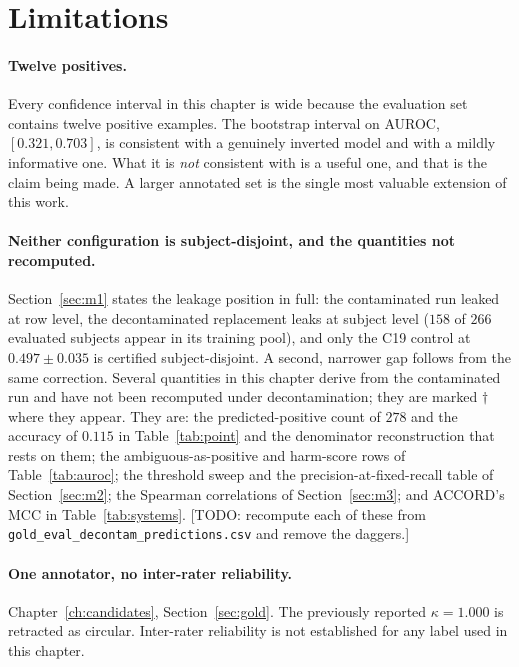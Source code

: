 \section{Limitations}
\label{sec:eval-limitations}

\paragraph{Twelve positives.} Every confidence interval in this chapter is wide
because the evaluation set contains twelve positive examples. The bootstrap
interval on AUROC, $[0.321, 0.703]$, is consistent with a genuinely inverted
model and with a mildly informative one. What it is \emph{not} consistent with
is a useful one, and that is the claim being made. A larger annotated set is the
single most valuable extension of this work.

\paragraph{Neither configuration is subject-disjoint, and the quantities not
recomputed.} Section~\ref{sec:m1} states the leakage position in full: the
contaminated run leaked at row level, the decontaminated replacement leaks at
subject level ($158$ of $266$ evaluated subjects appear in its training pool),
and only the C19 control at $0.497 \pm 0.035$ is certified subject-disjoint. A
second, narrower gap follows from the same correction. Several quantities in
this chapter derive from the contaminated run and have not been recomputed under
decontamination; they are marked $\dagger$ where they appear. They are: the
predicted-positive count of $278$ and the accuracy of $0.115$ in
Table~\ref{tab:point} and the denominator reconstruction that rests on them; the
ambiguous-as-positive and harm-score rows of Table~\ref{tab:auroc}; the
threshold sweep and the precision-at-fixed-recall table of Section~\ref{sec:m2};
the Spearman correlations of Section~\ref{sec:m3}; and ACCORD's MCC in
Table~\ref{tab:systems}. [TODO: recompute each of these from
\texttt{gold\_eval\_decontam\_predictions.csv} and remove the daggers.]

\paragraph{One annotator, no inter-rater reliability.}
Chapter~\ref{ch:candidates}, Section~\ref{sec:gold}. The previously reported
$\kappa = 1.000$ is retracted as circular. Inter-rater reliability is not
established for any label used in this chapter.

